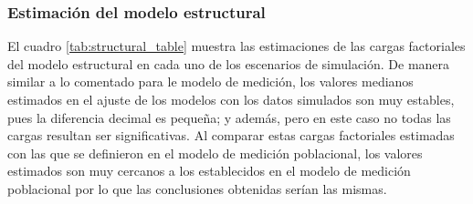 \documentclass[
  english]{revcoles}
\begin{document}
\subsubsection{Estimación del modelo estructural}

El cuadro \ref{tab:structural_table} muestra las estimaciones de las
cargas factoriales del modelo estructural en cada uno de los escenarios
de simulación. De manera similar a lo comentado para le modelo de
medición, los valores medianos estimados en el ajuste de los modelos con
los datos simulados son muy estables, pues la diferencia decimal es
pequeña; y además, pero en este caso no todas las cargas resultan ser
significativas. Al comparar estas cargas factoriales estimadas con las
que se definieron en el modelo de medición poblacional, los valores
estimados son muy cercanos a los establecidos en el modelo de medición
poblacional por lo que las conclusiones obtenidas serían las mismas.
\end{document}
